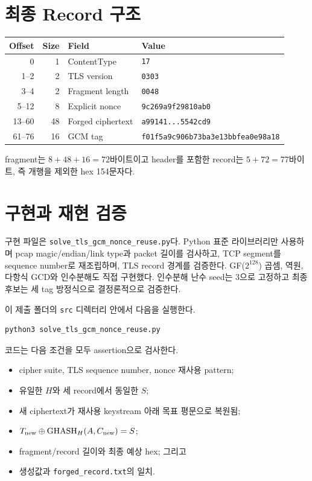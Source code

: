 \documentclass[10pt,a4paper]{article}
\begin{document}
\section{최종 Record 구조}

\begin{center}
\small
\begin{tabularx}{\textwidth}{rrlX}
\toprule
Offset & Size & Field & Value \\
\midrule
0 & 1 & ContentType & \texttt{17} \\
1--2 & 2 & TLS version & \texttt{0303} \\
3--4 & 2 & Fragment length & \texttt{0048} \\
5--12 & 8 & Explicit nonce & \texttt{9c269a9f29810ab0} \\
13--60 & 48 & Forged ciphertext & \texttt{a99141...5542cd9} \\
61--76 & 16 & GCM tag & \texttt{f01f5a9c906b73ba3e13bbfea0e98a18} \\
\bottomrule
\end{tabularx}
\end{center}

fragment는 $8+48+16=72$바이트이고 header를 포함한 record는
$5+72=77$바이트, 즉 개행을 제외한 hex 154문자다.

\section{구현과 재현 검증}

구현 파일은 \texttt{solve\_tls\_gcm\_nonce\_reuse.py}다. Python 표준
라이브러리만 사용하며 pcap magic/endian/link type과 packet 길이를 검사하고,
TCP segment를 sequence number로 재조립하며, TLS record 경계를
검증한다. GF($2^{128}$) 곱셈, 역원, 다항식 GCD와 인수분해도 직접
구현했다. 인수분해 난수 seed는 3으로 고정하고 최종 후보는 세 tag
방정식으로 결정론적으로 검증한다.

이 제출 폴더의 \texttt{src} 디렉터리 안에서 다음을 실행한다.

\begin{lstlisting}
python3 solve_tls_gcm_nonce_reuse.py
\end{lstlisting}

코드는 다음 조건을 모두 assertion으로 검사한다.

\begin{itemize}
  \item cipher suite, TLS sequence number, nonce 재사용 pattern;
  \item 유일한 $H$와 세 record에서 동일한 $S$;
  \item 새 ciphertext가 재사용 keystream 아래 목표 평문으로 복원됨;
  \item $T_{\rm new}\oplus\operatorname{GHASH}_H(A,C_{\rm new})=S$;
  \item fragment/record 길이와 최종 예상 hex; 그리고
  \item 생성값과 \texttt{forged\_record.txt}의 일치.
\end{itemize}
\end{document}
